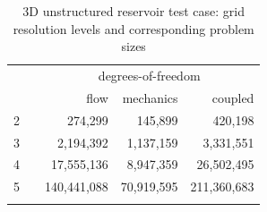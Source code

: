 \begin{table}
    \centering
    \caption[3D unstructured reservoir problem sizes]{3D unstructured reservoir test case: grid resolution levels and corresponding problem sizes}
    \label{tab:mazumodel2_par_dims}
    \begin{tabular}{crrrr}
      \hline\noalign{\smallskip}
      \multirow{2}{*}{$\ell$} & & \multicolumn{3}{c}{degrees-of-freedom} \\
      \noalign{\smallskip}\cline{3-5}\noalign{\smallskip}
      & & flow & mechanics & coupled \\
      \hline\noalign{\smallskip}
        2 & &     274,299 &    145,899 &     420,198 \\
        3 & &   2,194,392 &  1,137,159 &   3,331,551 \\
        4 & &  17,555,136 &  8,947,359 &  26,502,495 \\
        5 & & 140,441,088 & 70,919,595 & 211,360,683 \\
      \hline\noalign{\smallskip}
    \end{tabular}
\end{table}

